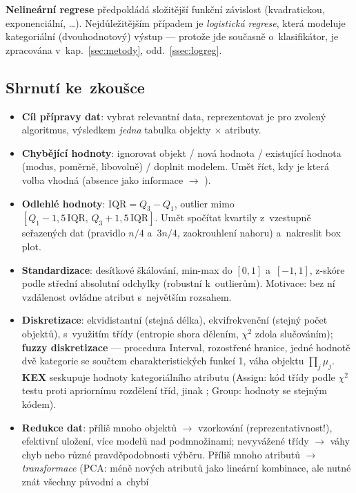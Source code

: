 \documentclass[11pt,a4paper]{article}
\theoremstyle{definition}
\begin{document}
\textbf{Nelineární regrese} předpokládá složitější funkční závislost (kvadratickou,
exponenciální, \dots). Nejdůležitějším případem je \emph{logistická regrese}, která
modeluje kategoriální (dvouhodnotový) výstup --- protože jde současně o~klasifikátor, je
zpracována v~kap.~\ref{sec:metody}, odd.~\ref{ssec:logreg}.

\subsection{Shrnutí ke~zkoušce}

\begin{itemize}
\item \textbf{Cíl přípravy dat}: vybrat relevantní data, reprezentovat je pro zvolený
      algoritmus, výsledkem \emph{jedna} tabulka objekty $\times$ atributy.
\item \textbf{Chybějící hodnoty}: ignorovat objekt / nová hodnota  / existující
      hodnota (modus, poměrně, libovolně) / doplnit modelem. Umět říct, kdy je která volba
      vhodná (absence jako informace $\to$ ).
\item \textbf{Odlehlé hodnoty}: $\mathrm{IQR}=Q_3-Q_1$, outlier mimo
      $[Q_1-1{,}5\,\mathrm{IQR},\,Q_3+1{,}5\,\mathrm{IQR}]$. Umět spočítat kvartily
      z~vzestupně seřazených dat (pravidlo $n/4$ a~$3n/4$, zaokrouhlení nahoru) a~nakreslit
      box plot.
\item \textbf{Standardizace}: desítkové škálování, min-max do $[0,1]$ a~$[-1,1]$, z-skóre
      podle střední absolutní odchylky (robustní k~outlierům).
      Motivace: bez ní vzdálenost ovládne atribut s~největším rozsahem.
\item \textbf{Diskretizace}: ekvidistantní (stejná délka), ekvifrekvenční (stejný počet
      objektů), s~využitím třídy (entropie shora dělením, $\chi^2$ zdola slučováním);
      \textbf{fuzzy diskretizace} --- procedura Interval, rozostřené hranice, jedné hodnotě
      dvě kategorie se součtem charakteristických funkcí 1, váha objektu $\prod_j\mu_j$.
      \textbf{KEX} seskupuje hodnoty kategoriálního atributu (Assign: kód třídy podle
      $\chi^2$ testu proti apriornímu rozdělení tříd, jinak ; Group: hodnoty se
      stejným kódem).
\item \textbf{Redukce dat}: příliš mnoho objektů $\to$ vzorkování (reprezentativnost!),
      efektivní uložení, více modelů nad podmnožinami; nevyvážené třídy $\to$ váhy chyb nebo
      různé pravděpodobnosti výběru. Příliš mnoho atributů $\to$ \emph{transformace} (PCA:
      méně nových atributů jako lineární kombinace, ale nutné znát všechny původní a~chybí

\end{itemize}
\end{document}
